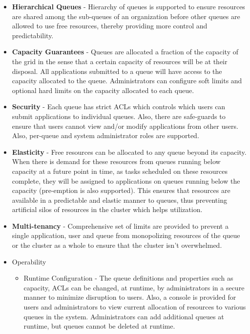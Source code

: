 \begin{itemize}

\item \textbf{Hierarchical Queues} - Hierarchy of queues is supported to ensure resources are shared among the sub-queues of an organization before other queues are allowed to use free resources, thereby providing more control and predictability.

\item \textbf{Capacity Guarantees} - Queues are allocated a fraction of the capacity of the grid in the sense that a certain capacity of resources will be at their disposal. All applications submitted to a queue will have access to the capacity allocated to the queue. Administrators can configure soft limits and optional hard limits on the capacity allocated to each queue.

\item \textbf{Security} - Each queue has strict ACLs which controls which users can submit applications to individual queues. Also, there are safe-guards to ensure that users cannot view and/or modify applications from other users. Also, per-queue and system administrator roles are supported.

\item \textbf{Elasticity} - Free resources can be allocated to any queue beyond its capacity. When there is demand for these resources from queues running below capacity at a future point in time, as tasks scheduled on these resources complete, they will be assigned to applications on queues running below the capacity (pre-emption is also supported). This ensures that resources are available in a predictable and elastic manner to queues, thus preventing artificial silos of resources in the cluster which helps utilization.

\item \textbf{Multi-tenancy} - Comprehensive set of limits are provided to prevent a single application, user and queue from monopolizing resources of the queue or the cluster as a whole to ensure that the cluster isn't overwhelmed.

\item Operability
    \begin{itemize}
    \item Runtime Configuration - The queue definitions and properties such as capacity, ACLs can be changed, at runtime, by administrators in a secure manner to minimize disruption to users. Also, a console is provided for users and administrators to view current allocation of resources to various queues in the system. Administrators can add additional queues at runtime, but queues cannot be deleted at runtime.
    

\end{itemize}
\end{itemize}
